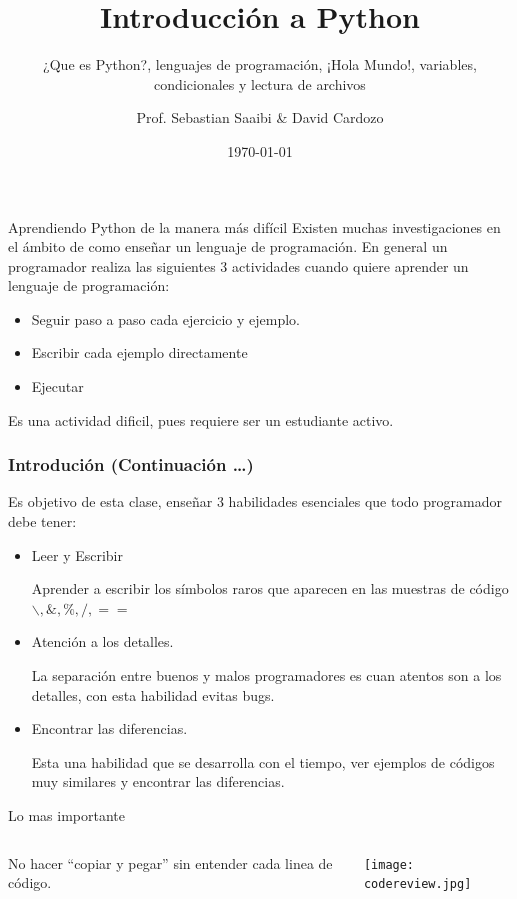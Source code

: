 \documentclass[]{beamer}
\author{Prof. Sebastian Saaibi \& David Cardozo\inst{1}}
\title{Introducción a Python }
\subtitle{¿Que es Python?, lenguajes de programación, ¡Hola Mundo!, variables, condicionales y lectura de archivos  } %
\institute[Universidad de los Andes]
{
	\inst{1}%
	Física   \\
	Lectura $3$ Herramientas Computacionales \\
	Universidad de los Andes
}
\date{\today} %
\begin{document}
	
\maketitle



\begin{frame}{Aprendiendo Python de la manera más difícil}
	Existen muchas investigaciones en el ámbito de como enseñar un lenguaje de programación. En general un programador realiza las siguientes 3 actividades cuando quiere aprender un lenguaje de programación:
\begin{itemize}[<+->]
	\item Seguir paso a paso cada ejercicio y ejemplo.
	\item Escribir cada ejemplo directamente
	\item Ejecutar
\end{itemize}

\pause
Es una actividad \alert{dificil}, pues requiere ser un estudiante activo.

\end{frame}

\begin{frame}
	\frametitle{Introdución (Continuación \ldots)}
	Es objetivo de esta clase, enseñar 3 habilidades esenciales que todo programador debe tener:
	\begin{itemize}[<+->]
		\item Leer y Escribir
		
		Aprender a escribir los símbolos raros que aparecen en las muestras de código $ \backslash, \&, \%, /, == $
		\item Atención a los detalles.
		
		La separación entre buenos y malos programadores es cuan atentos son a los detalles, con esta habilidad evitas \alert{bugs}.
		\item Encontrar las diferencias.
		
		Esta una habilidad que se desarrolla con el tiempo, ver ejemplos de códigos muy similares  y encontrar las diferencias. 
	\end{itemize}
	
\end{frame}

\begin{frame}{Lo mas importante}
	\begin{columns}[T] %
		\begin{column}[T]{5cm} %
		\huge No hacer \alert{``copiar y pegar''} sin entender cada linea de código.
		\end{column}
		\begin{column}[T]{5cm} %
			\centering
			\texttt{[image: codereview.jpg]}
		\end{column}
	\end{columns}
\end{frame}
\end{document}
